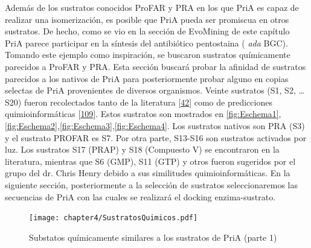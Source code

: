 \documentclass[12pt,twoside]{reedthesis}
\begin{document}
  Además de los sustratos conocidos ProFAR y PRA en los que PriA es capaz
  de realizar una isomerización, es posible que PriA pueda ser promiscua
  en otros sustratos. De hecho, como se vio en la sección de EvoMining de
  este capítulo PriA parece participar en la síntesis del antibiótico
  pentostaina ( \emph{ada} BGC). Tomando este ejemplo como inspiración, se
  buscaron sustratos químicamente parecidos a ProFAR y PRA. Esta sección
  buscará probar la afinidad de sustratos parecidos a los nativos de PriA
  para posteriormente probar alguno en copias selectas de PriA
  provenientes de diversos organismos. Veinte sustratos (S1, S2, \ldots{}
  S20) fueron recolectados tanto de la literatura
  {[}\protect\hyperlink{ref-adams_promiscuous_2014}{42}{]} como de
  predicciones quimioinformáticas
  {[}\protect\hyperlink{ref-jeffryes_mines_2015}{109}{]}. Estos sustratos
  son mostrados en \autoref{fig:Eschema1},
  \autoref{fig:Eschema2},\autoref{fig:Eschema3},\autoref{fig:Eschema4}.
  Los sustratos nativos son PRA (S3) y el sustrato PROFAR es S7. Por otra
  parte, S13-S16 son sustratos activados por luz. Los sustratos S17 (PRAP)
  y S18 (Compuesto V) se encontraron en la literatura, mientras que S6
  (GMP), S11 (GTP) y otros fueron sugeridos por el grupo del dr. Chris
  Henry debido a sus similitudes quimioinformáticas. En la siguiente
  sección, posteriormente a la selección de sustratos seleccionaremos las
  secuencias de PriA con las cuales se realizará el docking
  enzima-sustrato.
  
  \begin{figure}[h!tbp]
  \centering
  \texttt{[image: chapter4/SustratosQuimicos.pdf]}
  \caption[Substatos químicamente similares a los sustratos de PriA (parte 1)]{\footnotesize{Substatos químicamente similares a los sustratos de PriA (parte 1)}}
  \label{fig:Eschema1}
  \end{figure}
  
\end{document}
